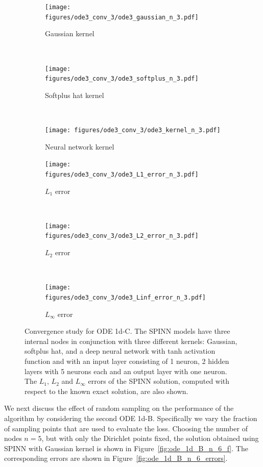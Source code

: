 \documentclass[12pt]{article}
\begin{document}
\begin{figure}
\begin{subfigure}{0.32\textwidth}
\centering
\texttt{[image: figures/ode3\_conv\_3/ode3\_gaussian\_n\_3.pdf]}
\caption{Gaussian kernel}
\label{fig:ode3_gaussian_n_3}
\end{subfigure}
~
\begin{subfigure}{0.32\textwidth}
\centering
\texttt{[image: figures/ode3\_conv\_3/ode3\_softplus\_n\_3.pdf]}
\caption{Softplus hat kernel}
\label{fig:ode3_softplus_n_3}
\end{subfigure}
~
\begin{subfigure}{0.32\textwidth}
\centering
\texttt{[image: figures/ode3\_conv\_3/ode3\_kernel\_n\_3.pdf]}
\caption{Neural network kernel}
\label{fig:ode3_kernel_n_3}
\end{subfigure}
\begin{subfigure}{0.32\textwidth}
\centering
\texttt{[image: figures/ode3\_conv\_3/ode3\_L1\_error\_n\_3.pdf]}
\caption{$L_1$ error}
\label{fig:ode3_L1_n_3}
\end{subfigure}
~
\begin{subfigure}{0.32\textwidth}
\centering
\texttt{[image: figures/ode3\_conv\_3/ode3\_L2\_error\_n\_3.pdf]}
\caption{$L_2$ error}
\label{fig:ode3_L2_n_3}
\end{subfigure}
~
\begin{subfigure}{0.32\textwidth}
\centering
\texttt{[image: figures/ode3\_conv\_3/ode3\_Linf\_error\_n\_3.pdf]}
\caption{$L_{\infty}$ error}
\label{fig:ode3_Linf_n_3_full}
\end{subfigure}
\caption{Convergence study for ODE 1d-C. The SPINN models have three internal nodes in conjunction with three different kernels: Gaussian, softplus hat, and a deep neural network with tanh activation function and with an input layer consisting of 1 neuron, 2 hidden layers with 5 neurons each and an output layer with one neuron. The $L_1$, $L_2$ and $L_{\infty}$ errors of the SPINN solution, computed with respect to the known exact solution, are also shown.}
\label{fig:ode_1d_C_n_3}
\end{figure}

We next discuss the effect of random sampling on the performance of the algorithm by considering the second ODE 1d-B. Specifically we vary the fraction of sampling points that are used to evaluate the loss. Choosing the number of nodes $n=5$, but with only the Dirichlet points fixed, the solution obtained using SPINN with Gaussian kernel is shown in Figure~\ref{fig:ode_1d_B_n_6_f}. The corresponding errors are shown in Figure~\ref{fig:ode_1d_B_n_6_errors}.
\end{document}

